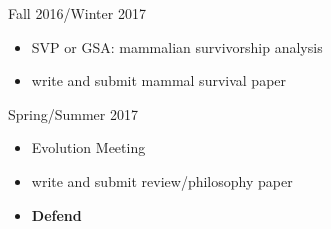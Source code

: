 \documentclass[12pt,letterpaper]{article}
\begin{document}
Fall 2016/Winter 2017
\begin{itemize}
  \item SVP or GSA: mammalian survivorship analysis
  \item write and submit mammal survival paper
\end{itemize}

Spring/Summer 2017
\begin{itemize}
  \item Evolution Meeting
  \item write and submit review/philosophy paper
  \item \textbf{Defend}
\end{itemize}



\clearpage


\end{document}

